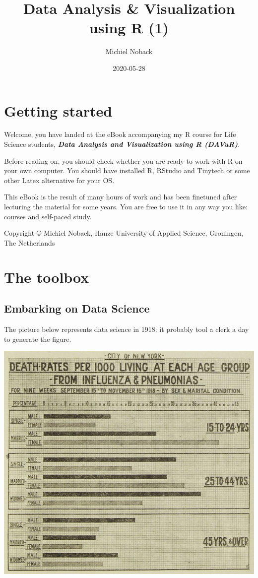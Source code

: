 \documentclass[]{book}
\title{Data Analysis \& Visualization using R (1)}
\author{Michiel Noback}
\date{2020-05-28}
\begin{document}
\maketitle

{
\setcounter{tocdepth}{1}
\tableofcontents
}
\hypertarget{getting-started}{%
\chapter{Getting started}\label{getting-started}}

Welcome, you have landed at the eBook accompanying my R course for Life Science students, \textbf{\emph{Data Analysis and Visualization using R (DAVuR)}}.

Before reading on, you should check whether you are ready to work with R on your own computer.
You should have installed R, RStudio and Tinytech or some other Latex alternative for your OS.

This eBook is the result of many hours of work and has been finetuned after lecturing the material for some years.
You are free to use it in any way you like: courses and self-paced study.

Copyright © Michiel Noback, Hanze University of Applied Science, Groningen, The Netherlands

\hypertarget{toolbox}{%
\chapter{The toolbox}\label{toolbox}}

\hypertarget{embarking-on-data-science}{%
\section{Embarking on Data Science}\label{embarking-on-data-science}}

The picture below represents data science in 1918: it probably tool a clerk a day to generate the figure.

\includegraphics{figures/influenza_1918_new_york.jpg}
\end{document}
